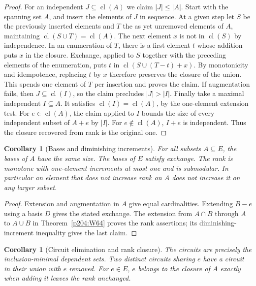 \documentclass[11pt,oneside,openany]{book}
\theoremstyle{plain}
\newtheorem{corollary}[theorem]{Corollary}
\theoremstyle{definition}
\theoremstyle{remark}
\begin{document}
\begin{proof}
For an independent \(J\subseteq\operatorname{cl}(A)\) we claim
\(|J|\le |A|\). Start with the spanning set \(A\), and insert
the elements of \(J\) in sequence. At a given step let \(S\)
be the previously inserted elements and \(T\) the as yet
unremoved elements of \(A\), maintaining
\(\operatorname{cl}(S\cup T)=\operatorname{cl}(A)\). The next
element \(x\) is not in \(\operatorname{cl}(S)\) by independence.
In an enumeration of \(T\), there is a first element \(t\)
whose addition puts \(x\) in the closure. Exchange, applied to
\(S\) together with the preceding elements of the enumeration,
puts \(t\) in \(\operatorname{cl}(S\cup(T-t)+x)\).
By monotonicity and idempotence, replacing \(t\) by \(x\)
therefore preserves the closure of the union. This spends one
element of \(T\) per insertion and proves the claim.
If augmentation fails, then \(J\subseteq\operatorname{cl}(I)\),
so the claim precludes \(|J|>|I|\). Finally take a maximal
independent \(I\subseteq A\). It satisfies
\(\operatorname{cl}(I)=\operatorname{cl}(A)\), by the
one-element extension test. For \(e\in\operatorname{cl}(A)\),
the claim applied to \(I\) bounds the size of every independent
subset of \(A+e\) by \(|I|\). For
\(e\notin\operatorname{cl}(A)\), \(I+e\) is independent.
Thus the closure recovered from rank is the original one.
\end{proof}

\begin{corollary}[Bases and diminishing increments]
\label{p204:W65}
For all subsets \(A\subseteq E\), the bases of \(A\) have the
same size. The bases of \(E\) satisfy exchange. The rank is
monotone with one-element increments at most one and is
submodular. In particular an element that does not increase
rank on \(A\) does not increase it on any larger subset.
\end{corollary}

\begin{proof}
Extension and augmentation in \(A\) give equal cardinalities.
Extending \(B-e\) using a basis \(D\) gives the stated exchange.
The extension from \(A\cap B\) through \(A\) to \(A\cup B\) in
Theorem~\ref{p204:W64} proves the rank assertions; its
diminishing-increment inequality gives the last claim.
\end{proof}

\begin{corollary}[Circuit elimination and rank closure]
\label{p204:W66}
The circuits are precisely the inclusion-minimal dependent sets.
Two distinct circuits sharing \(e\) have a circuit in their
union with \(e\) removed. For \(e\in E\), \(e\) belongs to the
closure of \(A\) exactly when adding it leaves the rank unchanged.
\end{corollary}
\end{document}

